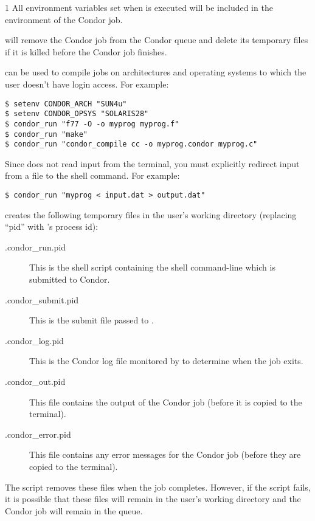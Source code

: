 \begin{ManPage}{\label{man-condor-run}}{1}
All environment variables set when  is executed will be
included in the environment of the Condor job.

 will remove the Condor job from the Condor queue and
delete its temporary files if it is killed before the Condor job
finishes.

\Examples

 can be used to compile jobs on architectures and
operating systems to which the user doesn't have login access.  For example:

\begin{verbatim}
$ setenv CONDOR_ARCH "SUN4u"
$ setenv CONDOR_OPSYS "SOLARIS28"
$ condor_run "f77 -O -o myprog myprog.f"
$ condor_run "make"
$ condor_run "condor_compile cc -o myprog.condor myprog.c"
\end{verbatim}

Since  does not read input from the terminal, you must
explicitly redirect input from a file to the shell command.  For
example:

\begin{verbatim}
$ condor_run "myprog < input.dat > output.dat"
\end{verbatim}

\Files

 creates the following temporary files in the user's
working directory (replacing ``pid'' with 's process id):
\begin{description}
\item[.condor\_run.pid] This is the shell script containing the shell
command-line which is submitted to Condor.
\item[.condor\_submit.pid] This is the submit file passed to
. 
\item[.condor\_log.pid] This is the Condor log file monitored by
 to determine when the job exits.
\item[.condor\_out.pid] This file contains the output of the Condor
job (before it is copied to the terminal).
\item[.condor\_error.pid] This file contains any error messages for the Condor
job (before they are copied to the terminal).
\end{description}
The script removes these files when the job completes.  However, if
the script fails, it is possible that these files will remain in the
user's working directory and the Condor job will remain in the queue.

\GenRem


\end{ManPage}
